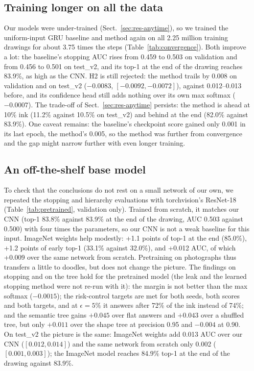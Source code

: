 \subsection{Training longer on all the data}
\label{sec:res-long}



Our models were under-trained (Sect.~\ref{sec:res-anytime}), so we trained the uniform-input GRU
baseline and method again on all 2.25 million training drawings for about 3.75 times the steps
(Table~\ref{tab:convergence}). Both improve a lot: the baseline's stopping AUC rises from 0.459 to
0.503 on validation and from 0.456 to 0.501 on test\_v2, and its top-1 at the end of the drawing
reaches 83.9\%, as high as the CNN. H2 is still rejected: the method trails by 0.008 on validation
and on test\_v2 ($-0.0083$, $[-0.0092, -0.0072]$), against 0.012--0.013 before, and its confidence
head still adds nothing over its own max softmax ($-0.0007$). The trade-off of
Sect.~\ref{sec:res-anytime} persists: the method is ahead at 10\% ink (11.2\% against 10.5\% on
test\_v2) and behind at the end (82.0\% against 83.9\%). One caveat remains: the baseline's checkpoint
score gained only 0.001 in its last epoch, the method's 0.005, so the method was further from
convergence and the gap might narrow further with even longer training.

\subsection{An off-the-shelf base model}
\label{sec:res-base}



To check that the conclusions do not rest on a small network of our own, we repeated the stopping
and hierarchy evaluations with torchvision's ResNet-18 (Table~\ref{tab:pretrained}, validation only).
Trained from scratch, it matches our CNN (top-1 83.8\% against 83.9\% at the end of the drawing, AUC
0.503 against 0.500) with four times the parameters, so our CNN is not a weak baseline for this
input. ImageNet weights help modestly: +1.1 points of top-1 at the end (85.0\%), +1.2 points of early
top-1 (33.1\% against 32.0\%), and +0.012 AUC, of which +0.009 over the same network from scratch.
Pretraining on photographs thus transfers a little to doodles, but does not change the picture.
The findings on stopping and on the tree hold for the pretrained model (the leak and the learned
stopping method were not re-run with it): the margin is not better than the max softmax
($-0.0015$); the risk-control targets are met for both seeds, both scores and both targets, and at
$\epsilon = 5\%$ it answers after 72\% of the ink instead of 74\%; and the semantic tree gains
$+0.045$ over flat answers and $+0.043$ over a shuffled tree, but only $+0.011$ over the shape tree at
precision 0.95 and $-0.004$ at 0.90. On test\_v2 the picture is the same: ImageNet weights add
0.013 AUC over our CNN ($[0.012, 0.014]$) and the same network from scratch only 0.002
($[0.001, 0.003]$); the ImageNet model reaches 84.9\% top-1 at the end of the drawing against 83.9\%.

